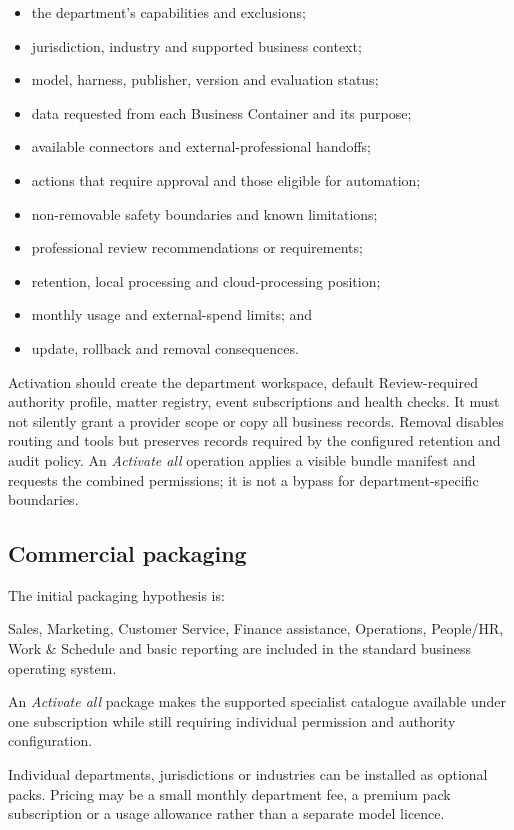 \begin{itemize}[leftmargin=*]
  \item the department's capabilities and exclusions;
  \item jurisdiction, industry and supported business context;
  \item model, harness, publisher, version and evaluation status;
  \item data requested from each Business Container and its purpose;
  \item available connectors and external-professional handoffs;
  \item actions that require approval and those eligible for automation;
  \item non-removable safety boundaries and known limitations;
  \item professional review recommendations or requirements;
  \item retention, local processing and cloud-processing position;
  \item monthly usage and external-spend limits; and
  \item update, rollback and removal consequences.
\end{itemize}

Activation should create the department workspace, default Review-required
authority profile, matter registry, event subscriptions and health checks.  It
must not silently grant a provider scope or copy all business records.  Removal
disables routing and tools but preserves records required by the configured
retention and audit policy.  An \emph{Activate all} operation applies a visible
bundle manifest and requests the combined permissions; it is not a bypass for
department-specific boundaries.

\subsection{Commercial packaging}

The initial packaging hypothesis is:

\begin{description}[leftmargin=0pt,style=nextline]
  \item[Tessaris Business Core]
  Sales, Marketing, Customer Service, Finance assistance, Operations, People/HR,
  Work \& Schedule and basic reporting are included in the standard business
  operating system.

  \item[Tessaris Complete Business]
  An \emph{Activate all} package makes the supported specialist catalogue
  available under one subscription while still requiring individual permission
  and authority configuration.

  \item[Specialist Packs]
  Individual departments, jurisdictions or industries can be installed as
  optional packs.  Pricing may be a small monthly department fee, a premium
  pack subscription or a usage allowance rather than a separate model licence.
\end{description}

